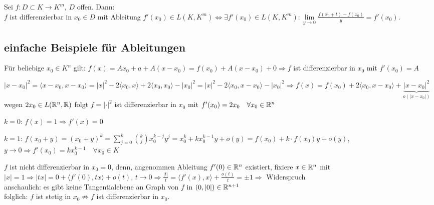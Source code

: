 	\begin{folgerung}
		Sei $f:D\subset K\to K^m$, $D$ offen. Dann: \\
		$f$ ist differenzierbar in $x_0\in D$ mit Ableitung $f'(x_0)\in L(K,K^m)\iff \exists f'(x_0)\in 
		L(K,K^m):\lim\limits_{y\to 0} \frac{f(x_0+t)-f(x_0)}{y}=f'(x_0)$.
	\end{folgerung}

\subsection{einfache Beispiele für Ableitungen}
	\begin{beispiel}
		Für beliebige $x_0\in K^n$ gilt: $f(x)=Ax_0+a+A(x-x_0)=f(x_0)+A(x-x_0)+0\Rightarrow f$ ist 
		differenzierbar in $x_0$ mit $f'(x_0)=A$
	\end{beispiel}

	\begin{beispiel}[$f:\real^n\to \real$ mit $f(x)=|x|^2$]
		$|x-x_0|^2=\langle x-x_0,x-x_0\rangle=|x|^2-2\langle x_0,x\rangle+2\langle x_0,x_0\rangle-|x_0|^2=
		|x|^2-2\langle x_0,x-x_0\rangle-|x_0|^2\Rightarrow f(x)=f(x_0)+2\langle x_0,x-x_0\rangle+
		\underbrace{|x-x_0|^2}_{o(|x-x_0|)}$ \\
		wegen $2x_0\in L(\mathbb{R}^n,\mathbb{R})$ folgt $f=|\cdot |^2$ ist differenzierbar in $x_0$ mit $f'(x_0)=2x_0
		\quad\forall x_0\in \mathbb{R}^n$
	\end{beispiel}

	\begin{beispiel}[$f:K\to K$ mit $f(x)=x^k$]
		\begin{compactitem}
			\item $k=0$: $f(x)=1\Rightarrow f'(x)=0$
			\item $k=1$: $f(x_0+y)=(x_0+y)^k=\sum\limits_{j=0}^{k} \binom{k}{j} x_0^{k-j}y^j=x_0^k+
			kx_0^{k-1}y+o(y)=f(x_0)+k\cdot f(x_0)y+o(y)$, $y\to 0\Rightarrow f'(x_0)=kx_0^{k-1} 
			\quad\forall x_0\in K$
		\end{compactitem}
	\end{beispiel}

	\begin{beispiel}[$f:\real^n\to\real$ mit $f(x)=|x|$]
		$f$ ist nicht differenzierbar in $x_0=0$, denn, angenommen Ableitung $f'(0)\in \mathbb{R}^n$ existiert, 
		fixiere $x\in \mathbb{R}^n$ mit $|x|=1\Rightarrow |tx|=0+\langle f'(0),tx\rangle+o(t)$, $t\to 0\Rightarrow
		\frac{|t|}{t}=\langle f'(x),x \rangle + \frac{o(t)}{t}=\pm 1 \Rightarrow$ Widerspruch \\
		anschaulich: es gibt keine Tangentialebene an Graph von $f$ in $(0,|0|)\in \mathbb{R}^{n+1}$ \\
		folglich: $f$ ist stetig in $x_0\not\Rightarrow f$ ist differenzierbar in $x_0$.
	\end{beispiel}
